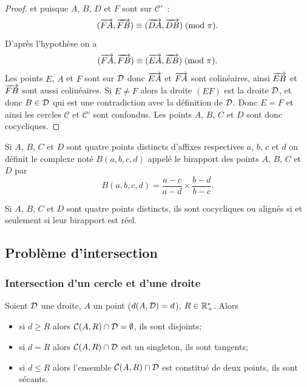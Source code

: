 \begin{proof}
  et puisque \(A\), \(B\), \(D\) et \(F\) sont sur \(\mathcal{C}'\)~:
  \begin{equation}
    (\overrightarrow{FA},\overrightarrow{FB}) \equiv (\overrightarrow{DA},\overrightarrow{DB})\!\pmod {\pi}.
  \end{equation}
  D'après l'hypothèse on a \begin{equation}
    (\overrightarrow{FA},\overrightarrow{FB}) \equiv (\overrightarrow{EA},\overrightarrow{EB})\!\pmod {\pi}.
  \end{equation}
  Les points \(E\), \(A\) et \(F\) sont sur \(\mathcal{D}\) donc \(\overrightarrow{EA}\) et
  \(\overrightarrow{FA}\) sont colinéaires, ainsi \(\overrightarrow{EB}\) et \(\overrightarrow{FB}\) sont
  aussi colinéaires. Si \(E \neq F\) alors la droite \((EF)\) est la droite
  \(\mathcal{D}\), et donc \(B \in \mathcal{D}\) qui est une contradiction avec la définition
  de \(\mathcal{D}\). Donc \(E = F\) et ainsi les cercles \(\mathcal{C}\) et
  \(\mathcal{C}'\) sont confondus. Les points \(A\), \(B\), \(C\) et \(D\)
  sont donc cocycliques.
\end{proof}

\begin{defdef}[Birapport]
  Si \(A\), \(B\), \(C\) et \(D\) sont quatre points distincts d'affixes
  respectives \(a\), \(b\), \(c\) et \(d\) on définit le complexe noté \(B(a ,
  b , c , d)\) appelé le birapport des points \(A\), \(B\), \(C\) et \(D\) par
  \begin{equation}
    B(a , b , c , d) = \frac{a - c}{a - d} \times \frac{b - d}{b - c}.
  \end{equation}
\end{defdef}

\begin{theo}
  Si \(A\), \(B\), \(C\) et \(D\) sont quatre points distincts, ils sont
  cocycliques ou alignés si et seulement si leur birapport est réel.
\end{theo}

\subsection{Problème d'intersection}

\subsubsection{Intersection d'un cercle et d'une droite}

\begin{prop}
  Soient \(\mathcal{D}\) une droite, \(A\) un point (\(d(A , \mathcal{D}) = d\)), \(R \in
  \mathbb{R}_{+}^{*}\). Alors
  \begin{itemize}
    \item si \(d \geqslant R\) alors \(\mathcal{C}(A,R) \cap \mathcal{D} = \emptyset\),
      ils sont disjoints;
    \item si \(d = R\) alors \(\mathcal{C}(A,R) \cap \mathcal{D}\) est un singleton, ils
      sont tangents;
    \item si \(d\leqslant R\) alors l'ensemble \(\mathcal{C}(A,R) \cap \mathcal{D}\) est
      constitué de deux points, ils sont sécants.
  \end{itemize}
\end{prop}

